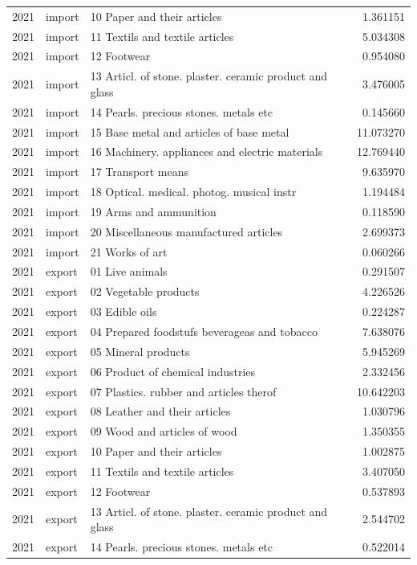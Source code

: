 \begin{tabular}{rllr}
2021 & import & 10 Paper and their articles & 1.361151 \\
2021 & import & 11 Textils and textile articles & 5.034308 \\
2021 & import & 12 Footwear & 0.954080 \\
2021 & import & 13 Articl. of stone. plaster. ceramic product and glass & 3.476005 \\
2021 & import & 14 Pearls. precious stones. metals etc & 0.145660 \\
2021 & import & 15 Base metal and articles of base metal & 11.073270 \\
2021 & import & 16 Machinery. appliances and electric materials & 12.769440 \\
2021 & import & 17 Transport means & 9.635970 \\
2021 & import & 18 Optical. medical. photog. musical instr & 1.194484 \\
2021 & import & 19 Arms and ammunition & 0.118590 \\
2021 & import & 20 Miscellaneous manufactured articles & 2.699373 \\
2021 & import & 21 Works of art & 0.060266 \\
2021 & export & 01 Live animals & 0.291507 \\
2021 & export & 02 Vegetable products & 4.226526 \\
2021 & export & 03 Edible oils & 0.224287 \\
2021 & export & 04 Prepared foodstufs beverageas and tobacco & 7.638076 \\
2021 & export & 05 Mineral products & 5.945269 \\
2021 & export & 06 Product of chemical industries & 2.332456 \\
2021 & export & 07 Plastics. rubber and articles therof & 10.642203 \\
2021 & export & 08 Leather and their articles & 1.030796 \\
2021 & export & 09 Wood and articles of wood & 1.350355 \\
2021 & export & 10 Paper and their articles & 1.002875 \\
2021 & export & 11 Textils and textile articles & 3.407050 \\
2021 & export & 12 Footwear & 0.537893 \\
2021 & export & 13 Articl. of stone. plaster. ceramic product and glass & 2.544702 \\
2021 & export & 14 Pearls. precious stones. metals etc & 0.522014 \\

\end{tabular}

